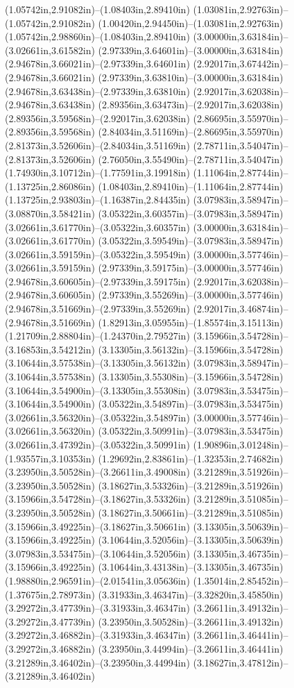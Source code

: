 (1.05742in,2.91082in)--(1.08403in,2.89410in) (1.03081in,2.92763in)--(1.05742in,2.91082in) (1.00420in,2.94450in)--(1.03081in,2.92763in) (1.05742in,2.98860in)--(1.08403in,2.89410in) (3.00000in,3.63184in)--(3.02661in,3.61582in) (2.97339in,3.64601in)--(3.00000in,3.63184in) (2.94678in,3.66021in)--(2.97339in,3.64601in) (2.92017in,3.67442in)--(2.94678in,3.66021in) (2.97339in,3.63810in)--(3.00000in,3.63184in) (2.94678in,3.63438in)--(2.97339in,3.63810in) (2.92017in,3.62038in)--(2.94678in,3.63438in) (2.89356in,3.63473in)--(2.92017in,3.62038in) (2.89356in,3.59568in)--(2.92017in,3.62038in) (2.86695in,3.55970in)--(2.89356in,3.59568in) (2.84034in,3.51169in)--(2.86695in,3.55970in) (2.81373in,3.52606in)--(2.84034in,3.51169in) (2.78711in,3.54047in)--(2.81373in,3.52606in) (2.76050in,3.55490in)--(2.78711in,3.54047in) (1.74930in,3.10712in)--(1.77591in,3.19918in) (1.11064in,2.87744in)--(1.13725in,2.86086in) (1.08403in,2.89410in)--(1.11064in,2.87744in) (1.13725in,2.93803in)--(1.16387in,2.84435in) (3.07983in,3.58947in)--(3.08870in,3.58421in) (3.05322in,3.60357in)--(3.07983in,3.58947in) (3.02661in,3.61770in)--(3.05322in,3.60357in) (3.00000in,3.63184in)--(3.02661in,3.61770in) (3.05322in,3.59549in)--(3.07983in,3.58947in) (3.02661in,3.59159in)--(3.05322in,3.59549in) (3.00000in,3.57746in)--(3.02661in,3.59159in) (2.97339in,3.59175in)--(3.00000in,3.57746in) (2.94678in,3.60605in)--(2.97339in,3.59175in) (2.92017in,3.62038in)--(2.94678in,3.60605in) (2.97339in,3.55269in)--(3.00000in,3.57746in) (2.94678in,3.51669in)--(2.97339in,3.55269in) (2.92017in,3.46874in)--(2.94678in,3.51669in) (1.82913in,3.05955in)--(1.85574in,3.15113in) (1.21709in,2.88804in)--(1.24370in,2.79527in) (3.15966in,3.54728in)--(3.16853in,3.54212in) (3.13305in,3.56132in)--(3.15966in,3.54728in) (3.10644in,3.57538in)--(3.13305in,3.56132in) (3.07983in,3.58947in)--(3.10644in,3.57538in) (3.13305in,3.55308in)--(3.15966in,3.54728in) (3.10644in,3.54900in)--(3.13305in,3.55308in) (3.07983in,3.53475in)--(3.10644in,3.54900in) (3.05322in,3.54897in)--(3.07983in,3.53475in) (3.02661in,3.56320in)--(3.05322in,3.54897in) (3.00000in,3.57746in)--(3.02661in,3.56320in) (3.05322in,3.50991in)--(3.07983in,3.53475in) (3.02661in,3.47392in)--(3.05322in,3.50991in) (1.90896in,3.01248in)--(1.93557in,3.10353in) (1.29692in,2.83861in)--(1.32353in,2.74682in) (3.23950in,3.50528in)--(3.26611in,3.49008in) (3.21289in,3.51926in)--(3.23950in,3.50528in) (3.18627in,3.53326in)--(3.21289in,3.51926in) (3.15966in,3.54728in)--(3.18627in,3.53326in) (3.21289in,3.51085in)--(3.23950in,3.50528in) (3.18627in,3.50661in)--(3.21289in,3.51085in) (3.15966in,3.49225in)--(3.18627in,3.50661in) (3.13305in,3.50639in)--(3.15966in,3.49225in) (3.10644in,3.52056in)--(3.13305in,3.50639in) (3.07983in,3.53475in)--(3.10644in,3.52056in) (3.13305in,3.46735in)--(3.15966in,3.49225in) (3.10644in,3.43138in)--(3.13305in,3.46735in) (1.98880in,2.96591in)--(2.01541in,3.05636in) (1.35014in,2.85452in)--(1.37675in,2.78973in) (3.31933in,3.46347in)--(3.32820in,3.45850in) (3.29272in,3.47739in)--(3.31933in,3.46347in) (3.26611in,3.49132in)--(3.29272in,3.47739in) (3.23950in,3.50528in)--(3.26611in,3.49132in) (3.29272in,3.46882in)--(3.31933in,3.46347in) (3.26611in,3.46441in)--(3.29272in,3.46882in) (3.23950in,3.44994in)--(3.26611in,3.46441in) (3.21289in,3.46402in)--(3.23950in,3.44994in) (3.18627in,3.47812in)--(3.21289in,3.46402in) 